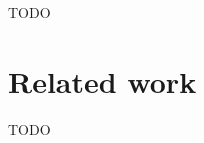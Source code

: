 \documentclass{acm_proc_article-sp}
\newcommand{\1}{\;}
\newcommand{\2}{\;\;}
\newcommand{\3}{\;\;\;}
\newcommand{\5}{\;\;\;\;\;}
\begin{document}
TODO

\section{Related work}
\label{sec.related}

TODO

\end{document}
